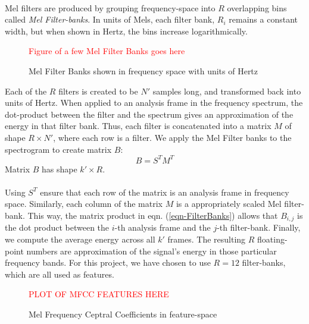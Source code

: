 \documentclass[12pt,letterpaper]{article}
\begin{document}
\paragraph*{}Mel filters are produced by grouping frequency-space into $R$ overlapping bins called \textit{Mel Filter-banks}. In units of Mels, each filter bank, $R_i$ remains a constant width, but when shown in Hertz, the bins increase logarithmically. 
\begin{figure}[H]
\label{fig-MelFilterBanks}
\begin{center}
\textcolor{red}{Figure of a few Mel Filter Banks goes here}
\end{center}
\caption{Mel Filter Banks shown in frequency space with units of Hertz}
\end{figure}
Each of the $R$ filters is created to be $N'$ samples long, and transformed back into units of Hertz. When applied to an analysis frame in the frequency spectrum, the dot-product between the filter and the spectrum gives an approximation of the energy in that filter bank. Thus, each filter is concatenated into a matrix $M$ of shape $R \times N'$, where each row is a filter. We apply the Mel Filter banks to the spectrogram to create matrix $B$:
\begin{equation}
\label{eqn-FilterBanks}
B = S^T M^T
\end{equation}
Matrix $B$ has shape $k' \times R$.

\paragraph*{}Using $S^T$ ensure that each row of the matrix is an analysis frame in frequency space. Similarly, each column of the matrix $M$ is a appropriately scaled Mel filter-bank. This way, the matrix product in eqn. (\ref{eqn-FilterBanks}) allows that $B_{i,j}$ is the dot product between the $i$-th analysis frame and the $j$-th filter-bank. Finally, we compute the average energy across all $k'$ frames. The resulting $R$ floating-point numbers are approximation of the signal's energy in those particular frequency bands. For this project, we have chosen to use $R = 12$ filter-banks, which are all used as features.

\begin{figure}[H]
\label{fig-FeatureMFCC}
\begin{center}
\textcolor{red}{PLOT OF MFCC FEATURES HERE}
\end{center}
\caption{Mel Frequency Ceptral Coefficients in feature-space}
\end{figure}
\end{document}
